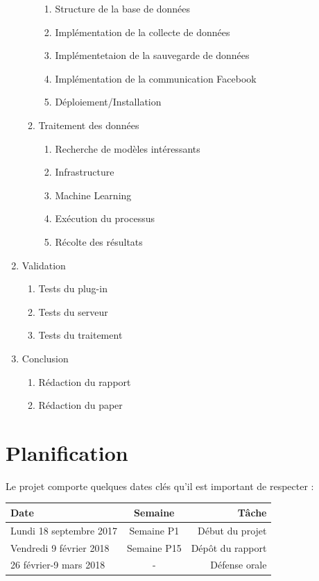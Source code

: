 \begin{enumerate}
\begin{enumerate}
\begin{enumerate}
			\item Structure de la base de données
			\item Implémentation de la collecte de données
			\item Implémentetaion de la sauvegarde de données
			\item Implémentation de la communication Facebook
			\item Déploiement/Installation
		\end{enumerate}
		\item Traitement des données
		\begin{enumerate}
			\item Recherche de modèles intéressants
			\item Infrastructure
			\item Machine Learning
			\item Exécution du processus
			\item Récolte des résultats
		\end{enumerate} 
	\end{enumerate}
	\item Validation
	\begin{enumerate}
		\item Tests du plug-in
		\item Tests du serveur
		\item Tests du traitement
	\end{enumerate}
	\item Conclusion
	\begin{enumerate}
		\item Rédaction du rapport
		\item Rédaction du paper
	\end{enumerate}
\end{enumerate}

\section{Planification}
Le projet comporte quelques dates clés qu’il est important de respecter :
\begin{center}
   \begin{tabular}{ | l | c | r | }
     \hline
		Date & Semaine & Tâche \\ \hline
		\color{red}Lundi 18 septembre 2017 & Semaine P1 & Début du projet \\ \hline
		\color{red}Vendredi 9 février 2018 & Semaine P15 & Dépôt du rapport \\ \hline
		\color{red}26 février-9 mars 2018 & - & Défense orale \\ \hline
     \hline
   \end{tabular}
\end{center}

